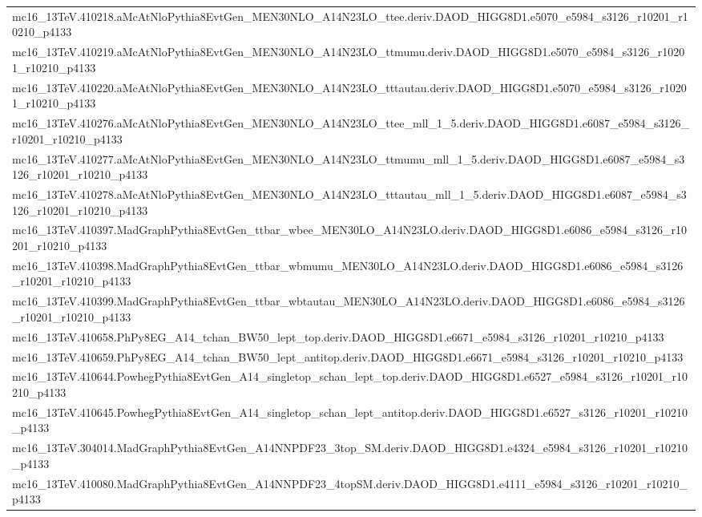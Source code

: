 \begin{adjustwidth}{-3em}{-3em}
\begin{longtable}{l}
mc16\_13TeV.410218.aMcAtNloPythia8EvtGen\_MEN30NLO\_A14N23LO\_ttee.deriv.DAOD\_HIGG8D1.e5070\_e5984\_s3126\_r10201\_r10210\_p4133 \\
mc16\_13TeV.410219.aMcAtNloPythia8EvtGen\_MEN30NLO\_A14N23LO\_ttmumu.deriv.DAOD\_HIGG8D1.e5070\_e5984\_s3126\_r10201\_r10210\_p4133 \\
mc16\_13TeV.410220.aMcAtNloPythia8EvtGen\_MEN30NLO\_A14N23LO\_tttautau.deriv.DAOD\_HIGG8D1.e5070\_e5984\_s3126\_r10201\_r10210\_p4133 \\
mc16\_13TeV.410276.aMcAtNloPythia8EvtGen\_MEN30NLO\_A14N23LO\_ttee\_mll\_1\_5.deriv.DAOD\_HIGG8D1.e6087\_e5984\_s3126\_r10201\_r10210\_p4133 \\
mc16\_13TeV.410277.aMcAtNloPythia8EvtGen\_MEN30NLO\_A14N23LO\_ttmumu\_mll\_1\_5.deriv.DAOD\_HIGG8D1.e6087\_e5984\_s3126\_r10201\_r10210\_p4133 \\
mc16\_13TeV.410278.aMcAtNloPythia8EvtGen\_MEN30NLO\_A14N23LO\_tttautau\_mll\_1\_5.deriv.DAOD\_HIGG8D1.e6087\_e5984\_s3126\_r10201\_r10210\_p4133 \\
mc16\_13TeV.410397.MadGraphPythia8EvtGen\_ttbar\_wbee\_MEN30LO\_A14N23LO.deriv.DAOD\_HIGG8D1.e6086\_e5984\_s3126\_r10201\_r10210\_p4133 \\
mc16\_13TeV.410398.MadGraphPythia8EvtGen\_ttbar\_wbmumu\_MEN30LO\_A14N23LO.deriv.DAOD\_HIGG8D1.e6086\_e5984\_s3126\_r10201\_r10210\_p4133 \\
mc16\_13TeV.410399.MadGraphPythia8EvtGen\_ttbar\_wbtautau\_MEN30LO\_A14N23LO.deriv.DAOD\_HIGG8D1.e6086\_e5984\_s3126\_r10201\_r10210\_p4133 \\
mc16\_13TeV.410658.PhPy8EG\_A14\_tchan\_BW50\_lept\_top.deriv.DAOD\_HIGG8D1.e6671\_e5984\_s3126\_r10201\_r10210\_p4133 \\
mc16\_13TeV.410659.PhPy8EG\_A14\_tchan\_BW50\_lept\_antitop.deriv.DAOD\_HIGG8D1.e6671\_e5984\_s3126\_r10201\_r10210\_p4133 \\
mc16\_13TeV.410644.PowhegPythia8EvtGen\_A14\_singletop\_schan\_lept\_top.deriv.DAOD\_HIGG8D1.e6527\_e5984\_s3126\_r10201\_r10210\_p4133 \\
mc16\_13TeV.410645.PowhegPythia8EvtGen\_A14\_singletop\_schan\_lept\_antitop.deriv.DAOD\_HIGG8D1.e6527\_s3126\_r10201\_r10210\_p4133 \\
mc16\_13TeV.304014.MadGraphPythia8EvtGen\_A14NNPDF23\_3top\_SM.deriv.DAOD\_HIGG8D1.e4324\_e5984\_s3126\_r10201\_r10210\_p4133 \\
mc16\_13TeV.410080.MadGraphPythia8EvtGen\_A14NNPDF23\_4topSM.deriv.DAOD\_HIGG8D1.e4111\_e5984\_s3126\_r10201\_r10210\_p4133 \\

\end{longtable}
\end{adjustwidth}
